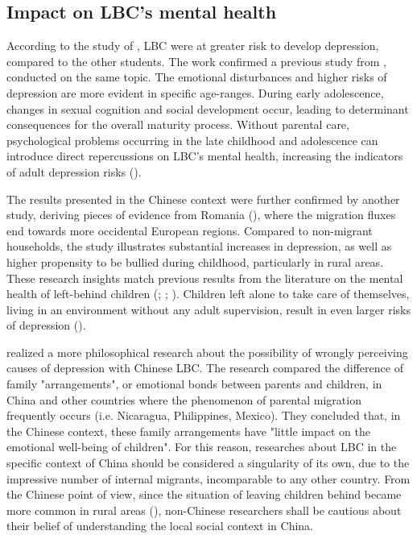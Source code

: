 \subsection{Impact on LBC's mental health}
\label{subsec:impact_mental_health}

According to the study of \textcite{he2012depression}, LBC were at greater risk to develop depression, compared to the other students. The work confirmed a previous study from \textcite{fan2010emotional}, conducted on the same topic. The emotional disturbances and higher risks of depression are more evident in specific age-ranges. During early adolescence, changes in sexual cognition and social development occur, leading to determinant consequences for the overall maturity process. Without parental care, psychological problems occurring in the late childhood and adolescence can introduce direct repercussions on LBC's mental health, increasing the indicators of adult depression risks  (\cite{kosterman2010assessment}).

The results presented in the Chinese context were further confirmed by another study, deriving pieces of evidence from Romania (\cite{botezat2014impact}), where the migration fluxes end towards more occidental European regions. Compared to non-migrant households, the study illustrates substantial increases in depression, as well as higher propensity to be bullied during childhood,  particularly in rural areas. These research insights match previous results from the literature on the mental health of left-behind children (\cite{gibson2011happens}; \cite{dreby2007children}; \cite{mazzucato2011transnational}). Children left alone to take care of themselves, living in an environment without any adult supervision, result in even larger risks of depression (\cite{lahaie2009work}).

\textcite{ren2016consequences} realized a more philosophical research about the possibility of wrongly perceiving causes of depression with Chinese LBC. The research compared the difference of family "arrangements", or emotional bonds between parents and children, in China and other countries where the phenomenon of parental migration frequently occurs (i.e. Nicaragua, Philippines, Mexico). They concluded that, in the Chinese context, these family arrangements have "little impact on the emotional well-being of children". For this reason, researches about LBC in the specific context of China should be considered a singularity of its own, due to the impressive number of internal migrants, incomparable to any other country. From the Chinese point of view, since the situation of leaving children behind became more common in rural areas (\cite{hao2006discussion}), non-Chinese researchers shall be cautious about their belief of understanding the local social context in China.



